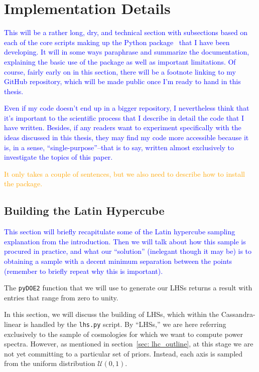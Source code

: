 \chapter{Implementation Details}
\label{chap: implementation}

\textcolor{blue}{This will be a rather long, dry, and technical section with 
subsections based on each of the core scripts making up the Python package \
that I have been developing. It will in some ways paraphrase and summarize the 
documentation, explaining the basic use of the package as well as important 
limitations. Of course, fairly early on in this section, there will be a 
footnote linking to my GitHub repository, which will be made public once I'm 
ready to hand in this thesis.}

\textcolor{blue}{Even if my code doesn't end up in a bigger repository, I 
nevertheless think that it's important to the scientific process that I 
describe in detail the code that I have written. Besides, if any readers want 
to experiment specifically with the ideas discussed in this thesis, they may 
find my code more accessible because it is, in a sense, ``single-purpose''--that 
is to say, written almost exclusively to investigate the topics of this 
paper.}

\textcolor{orange}{It only takes a couple of sentences, but we also need to 
describe how to install the package.}

\section{Building the Latin Hypercube}
\label{sec: build_lhc}


\textcolor{blue}{This section will briefly recapitulate some of the Latin hypercube sampling
explanation from the introduction. Then we will talk about how this sample is
procured in practice, and what our ``solution'' (inelegant though it may be)
is to obtaining a sample with a decent minimum separation between the points
(remember to briefly repeat why this is important).}

The \verb|pyDOE2| function that we will use to generate our LHSs
returns a result with entries that range from zero to unity. 

In this section, we will discuss the building of LHSs, which within the
Cassandra-linear is handled by the \verb|lhs.py| script.
By ``LHSs,'' we are here referring exclusively to the
sample of cosmologies for which we want to compute power spectra.
However, as mentioned in section~\ref{sec: lhc_outline}, at this stage we 
are not yet committing to a particular set of priors. Instead, each axis is 
sampled from the uniform distribution $\mathcal{U} (0, 1)$.

